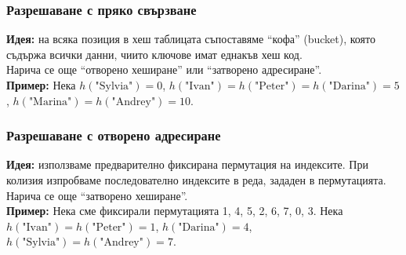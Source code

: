 \documentclass[alsotrans]{beamerswitch}
\begin{document}
\begin{frame}
  \frametitle{Разрешаване с пряко свързване}
  \textbf{Идея:} на всяка позиция в хеш таблицата съпоставяме ``кофа'' (bucket), която съдържа всички данни, чиито ключове имат еднакъв хеш код.\\
  \pause
  Нарича се още ``отворено хеширане'' или ``затворено адресиране''.\\
  \pause
  \textbf{Пример:} Нека $h(\text{"Sylvia"{}}) = 0$, $h(\text{"Ivan"{}}) = h(\text{"Peter"{}}) = h(\text{"Darina"{}}) = 5$, $h(\text{"Marina"{}}) = h(\text{"Andrey"{}}) = 10$.
  \begin{center}
    \small
  \end{center}
\end{frame}

\begin{frame}
  \frametitle{Разрешаване с отворено адресиране}
  \textbf{Идея:} използваме предварително фиксирана пермутация на индексите. При колизия изпробваме последователно индексите в реда, зададен в пермутацията.\\[2ex]
  \pause
  Нарича се още ``затворено хеширане''.\\[2ex]
  \pause
  \textbf{Пример:} Нека сме фиксирали пермутацията 1, 4, 5, 2, 6, 7, 0, 3.
  Нека $h(\text{"Ivan"{}}) = h(\text{"Peter"{}}) = 1$, $h(\text{"Darina"{}}) = 4$, $h(\text{"Sylvia"{}}) = h(\text{"Andrey"{}}) = 7$.
  \begin{center}
    \small
  \end{center}
\end{frame}
\end{document}
